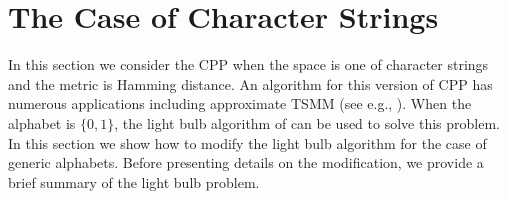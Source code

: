 \documentclass{article}
\theoremstyle{definition}
\theoremstyle{remark}
\begin{document}
\begin{table}[ht]
\centering  {}
\vspace{0.2in}
\caption{Comparison with Real Data sets. \protect\newline Data set 1: $Repeated Insect Behavior Dataset 1$; \protect\newline Data set 2: $Repeated Insect Behavior Dataset 2$; \protect\newline Data set 3: $Repeated Insect Behavior Dataset 3$}\label{table3} \end{table}
\section{The Case of Character Strings}\label{sec4}
In this section we consider the CPP when the space is one of character strings and the metric is Hamming distance. An algorithm for this version of CPP has numerous applications including approximate TSMM (see e.g., \cite{BES03}). When the alphabet is $\{0,1\}$, the light bulb algorithm of \cite{RSJ89} can be used to solve this problem. In this section we show how to modify the light bulb algorithm for the case of generic alphabets. Before presenting details on the modification, we provide a brief summary of the light bulb problem.
\end{document}
